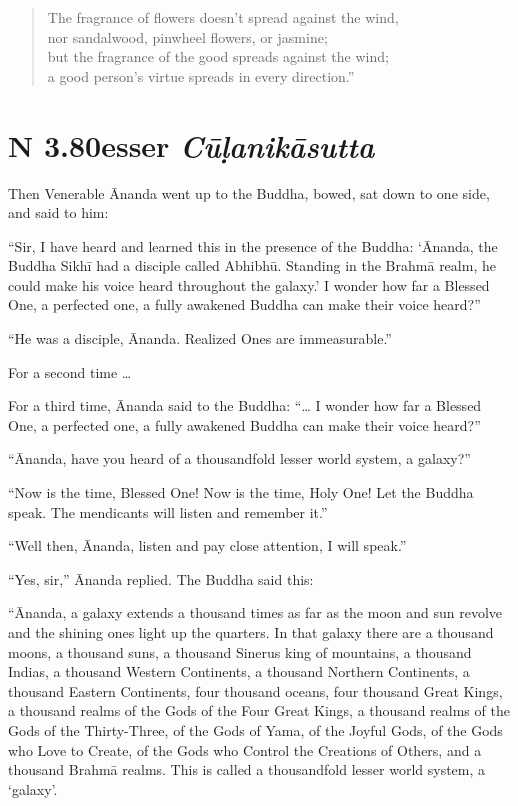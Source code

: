 \documentclass[12pt,openany]{book}%
\newcommand*{\suttatitleacronym}[1]{\smaller[2]{#1}\vspace*{.3em}}
\newcommand*{\suttatitletranslation}[1]{\linebreak{#1}}
\newcommand*{\suttatitleroot}[1]{\linebreak\smaller[2]\itshape{#1}}
\newcommand*{\tocacronym}[1]{\hspace*{-3.3em}{#1}\quad}
\newcommand*{\toctranslation}[1]{#1}
\newcommand*{\tocroot}[1]{(\textit{#1})}
\begin{document}
\begin{verse}%
The fragrance of flowers doesn’t spread against the wind, \\
nor sandalwood, pinwheel flowers, or jasmine; \\
but the fragrance of the good spreads against the wind; \\
a good person’s virtue spreads in every direction.” 

%
\end{verse}

%
\section*{{\suttatitleacronym AN 3.80}{\suttatitletranslation Lesser }{\suttatitleroot Cūḷanikāsutta}}
\addcontentsline{toc}{section}{\tocacronym{AN 3.80} \toctranslation{Lesser } \tocroot{Cūḷanikāsutta}}

Then Venerable Ānanda went up to the Buddha, bowed, sat down to one side, and said to him: 

“Sir, I have heard and learned this in the presence of the Buddha: ‘Ānanda, the Buddha \textsanskrit{Sikhī} had a disciple called \textsanskrit{Abhibhū}. Standing in the \textsanskrit{Brahmā} realm, he could make his voice heard throughout the galaxy.’ I wonder how far a Blessed One, a perfected one, a fully awakened Buddha can make their voice heard?” 

“He was a disciple, Ānanda. Realized Ones are immeasurable.” 

For a second time … 

For a third time, Ānanda said to the Buddha: “… I wonder how far a Blessed One, a perfected one, a fully awakened Buddha can make their voice heard?” 

“Ānanda, have you heard of a thousandfold lesser world system, a galaxy?” 

“Now is the time, Blessed One! Now is the time, Holy One! Let the Buddha speak. The mendicants will listen and remember it.” 

“Well then, Ānanda, listen and pay close attention, I will speak.” 

“Yes, sir,” Ānanda replied. The Buddha said this: 

“Ānanda, a galaxy extends a thousand times as far as the moon and sun revolve and the shining ones light up the quarters. In that galaxy there are a thousand moons, a thousand suns, a thousand Sinerus king of mountains, a thousand Indias, a thousand Western Continents, a thousand Northern Continents, a thousand Eastern Continents, four thousand oceans, four thousand Great Kings, a thousand realms of the Gods of the Four Great Kings, a thousand realms of the Gods of the Thirty-Three, of the Gods of Yama, of the Joyful Gods, of the Gods who Love to Create, of the Gods who Control the Creations of Others, and a thousand \textsanskrit{Brahmā} realms. This is called a thousandfold lesser world system, a ‘galaxy’. 
\end{document}
